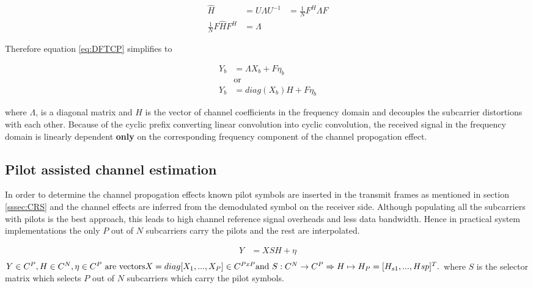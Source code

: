 \begin{equation}\label{eq:CircMtxExp}
    \begin{aligned}
        \hat{H} & = U\Lambda U^{-1}  & = \frac{1}{N}F^H \Lambda F\\
          \frac{1}{N}F\hat{H}F^H    & = \Lambda
    \end{aligned}
\end{equation}

Therefore equation \ref{eq:DFTCP} simplifies to 

\begin{equation}\label{eq:OFDMFinalEq}
    \begin{aligned}
        Y_b & = \Lambda{X_b} + F\eta_b \\ & \text{or} \\
        Y_b & = diag({X_b}){H} + F\eta_b
    \end{aligned}
\end{equation}

where $\Lambda$, is a diagonal matrix and ${H}$ is the vector of channel coefficients in the frequency domain and decouples the subcarrier distortions with each other. Because of the cyclic prefix converting linear convolution into cyclic convolution, the received signal in the frequency domain is linearly dependent \textbf{only} on the corresponding frequency component of the channel propogation effect.


\subsection{Pilot assisted channel estimation}\label{ssec:PilotAssistedChEst}


In order to determine the channel propogation effects known pilot symbols are inserted in the transmit frames as mentioned in section \ref{sssec:CRS} and the channel effects are inferred from the demodulated symbol on the receiver side. Although populating all the subcarriers with pilots is the best approach, this leads to high channel reference signal overheads and less data bandwidth. Hence in practical system implementations the only $P$ out of $N$ subcarriers carry the pilots and the rest are interpolated.

\begin{equation}\label{eq:OFDMChEstEq}
    \begin{aligned}
        Y & = XS{H} + \eta \\
    \end{aligned}
\end{equation}
$
Y \in \mathbb{C}^{P}, H \in \mathbb{C}^{N}, \eta \in \mathbb{C}^{P} \text{ are vectors}
\\ X = diag[X_{1},...,X_{P}] \in \mathbb{C}^{PxP}
\\ \text{and } S: \mathbb{C}^{N} \rightarrow \mathbb{C}^{P} \Rightarrow  H \mapsto H_P = [H_{s1},...,H{sp}]^T.
$
where $S$ is the selector matrix which selects $P$ out of $N$ subcarriers which carry the pilot symbols.


